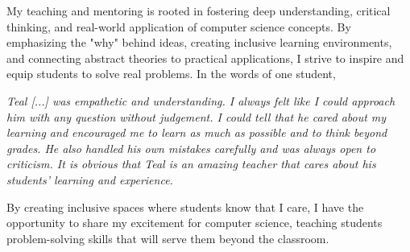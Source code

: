 \documentclass[11pt]{article}
\begin{document}
{My teaching and mentoring is rooted in fostering deep understanding, critical thinking, and real-world application of computer science concepts. By emphasizing the "why" behind ideas, creating inclusive learning environments, and connecting abstract theories to practical applications, I strive to inspire and equip students to solve real problems. In the words of one student,

\begin{displayquote}
	\textit{Teal [...] was empathetic and understanding. I always felt like I could approach him with any question without judgement. I could tell that he cared about my learning and encouraged me to learn as much as possible and to think beyond grades. He also handled his own mistakes carefully and was always open to criticism. It is obvious that Teal is an amazing teacher that cares about his students' learning and experience.}
\end{displayquote}

By creating inclusive spaces where students know that I care, I have the opportunity to share my excitement for computer science, teaching students problem-solving skills that will serve them beyond the classroom.
}
\end{document}
